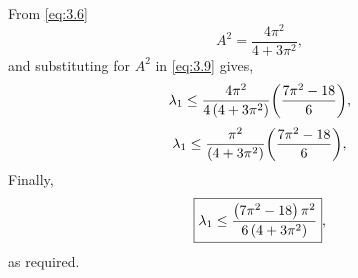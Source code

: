From \eqref{eq:3.6}
\[
	A^2=\frac{4\pi^2}{4+3\pi^2},
\]
and substituting for $A^2$ in \eqref{eq:3.9} gives,
\[
	\lambda_1 \leq \frac{4\pi^2}{4\left(4+3\pi^2\right)}\bigg(\frac{ 7\pi^2 -18}{6}\bigg),
\]
\[
	\lambda_1 \leq \frac{\pi^2}{\left(4+3\pi^2\right)}\bigg(\frac{ 7\pi^2 -18}{6}\bigg),
\]
Finally,
\[
	\boxed{\lambda_1 \leq \frac{\left(7\pi^2 - 18\right)\pi^2}{6\left(4+3\pi^2\right)}},
\]
as required.
